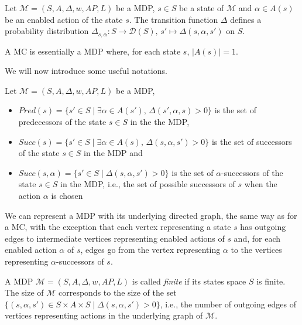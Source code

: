 \begin{property}
  Let $\mathcal{M} = (S,A, \Delta, w, AP, L)$ be a MDP, $s \in S$ be a state of $\mathcal{M}$ and $\alpha \in A(s)$ be an enabled action of the state $s$. The transition function $\Delta$ defines a probability distribution $\Delta_{s, \alpha}: S \rightarrow \mathcal{D}(S), \, s' \mapsto \Delta(s, \alpha, s')$ on $S$.
\end{property}
\begin{property}
  A MC is essentially a MDP where, for each state $s$, $|A(s)| = 1$.
\end{property}

We will now introduce some useful notations.

\begin{notation}
  Let $\mathcal{M}=(S, A, \Delta, w, AP, L)$ be a MDP,
  \begin{itemize}
    \item $Pred(s) = \{ s' \in S \; | \; \exists \alpha \in A(s'), \, \Delta(s', \alpha, s) > 0 \}$ is the set of predecessors of the state $s \in S$ in the the MDP,
    \item $Succ(s) = \{ s' \in S \; | \; \exists \alpha \in A(s), \, \Delta(s, \alpha, s') > 0 \}$ is the set of successors of the state $s \in S$ in the MDP and
    \item $Succ(s, \alpha) = \{ s' \in S \; | \; \Delta(s, \alpha, s') > 0 \}$
      is the set of $\alpha$-successors of the state $s \in S$ in the MDP, i.e., the set of possible successors of $s$ when the action $\alpha$ is chosen
  \end{itemize}
\end{notation}

We can represent a MDP with its underlying directed graph, the same way as for a MC, with the exception that each vertex representing a state $s$ has outgoing edges to intermediate vertices representing enabled actions of $s$ and, for each enabled action $\alpha$ of $s$, edges go from the vertex representing $\alpha$ to the vertices representing $\alpha$-successors of $s$.

\begin{notation}
  A MDP $\mathcal{M}=(S, A, \Delta, w, AP, L)$ is called \textit{finite} if its states space $S$ is finite. The size of $\mathcal{M}$ corresponds to the size
  of the set $\{(s, \alpha, s') \in S \times A \times S \; | \; \Delta(s, \alpha, s') > 0 \}$, i.e., the number of outgoing edges of vertices representing actions in the underlying graph of $\mathcal{M}$.
\end{notation}

